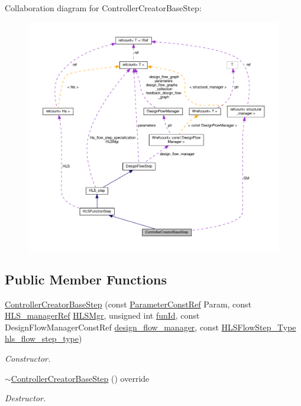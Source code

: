Collaboration diagram for Controller\+Creator\+Base\+Step\+:
\nopagebreak
\begin{figure}[H]
\begin{center}
\leavevmode
\includegraphics[width=350pt]{db/d1b/classControllerCreatorBaseStep__coll__graph}
\end{center}
\end{figure}
\subsection*{Public Member Functions}
\begin{DoxyCompactItemize}
\item 
\hyperlink{classControllerCreatorBaseStep_a3a40d6aa636355cf2059e04ea6f9e2af}{Controller\+Creator\+Base\+Step} (const \hyperlink{Parameter_8hpp_a37841774a6fcb479b597fdf8955eb4ea}{Parameter\+Const\+Ref} Param, const \hyperlink{hls__manager_8hpp_acd3842b8589fe52c08fc0b2fcc813bfe}{H\+L\+S\+\_\+manager\+Ref} \hyperlink{classHLS__step_ade85003a99d34134418451ddc46a18e9}{H\+L\+S\+Mgr}, unsigned int \hyperlink{classHLSFunctionStep_a3e6434fd86c698b0c70520b859bff5b0}{fun\+Id}, const Design\+Flow\+Manager\+Const\+Ref \hyperlink{classDesignFlowStep_ab770677ddf087613add30024e16a5554}{design\+\_\+flow\+\_\+manager}, const \hyperlink{hls__step_8hpp_ada16bc22905016180e26fc7e39537f8d}{H\+L\+S\+Flow\+Step\+\_\+\+Type} \hyperlink{classHLS__step_aefd59af15346ec3f10bf12bd756e6777}{hls\+\_\+flow\+\_\+step\+\_\+type})
\begin{DoxyCompactList}\small\item\em Constructor. \end{DoxyCompactList}\item 
\hyperlink{classControllerCreatorBaseStep_aec6e95d7d03daad670dcea1eeb6121da}{$\sim$\+Controller\+Creator\+Base\+Step} () override
\begin{DoxyCompactList}\small\item\em Destructor. \end{DoxyCompactList}\end{DoxyCompactItemize}

